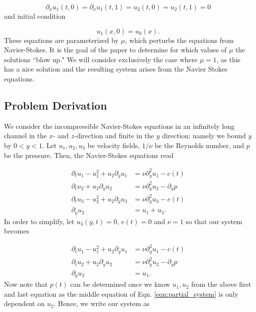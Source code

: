 \documentclass{CUP-JNL-DTM}%
\theoremstyle{definition}
\numberwithin{equation}{section}
\begin{document}
\begin{equation}
    \partial_x u_1(t,0) = \partial_x u_1(t,1) = u_2(t,0) = u_2(t,1) = 0
\end{equation}
and initial condition 

\begin{equation}
    u_1(x,0) = u_0(x).  
\end{equation}
These equations are parameterized by $\mu$, which perturbs the equations from Navier-Stokes. It is the goal of the paper to determine for which values of $\mu$ the solutions ``blow up." We will consider exclusively the case where $\mu = 1$, as this has a nice solution and the resulting system arises from the Navier Stokes equations.

\subsection{Problem Derivation}

We consider the incompressible Navier-Stokes equations in an infinitely long channel in the $x$- and $z$-direction and finite in the $y$ direction; namely we bound $y$ by $0 < y < 1$. Let $u_1, u_2, u_3$ be velocity fields, $1/\nu$ be the Reynolds number, and $p$ be the pressure. Then, the Navier-Stokes equations read

\begin{equation}
    \begin{split}
        \partial_t u_1 - u_1^2 + u_2\partial_yu_1 & = \nu \partial_y^2 u_1 - c(t) \\
        \partial_t u_2 + u_2 \partial_y u_2 & = \nu \partial_y^2 u_2 - \partial_y p \\
        \partial_t u_3 - u_3^2 + u_2\partial_y u_3 & = \nu \partial_y^2 u_3 - e(t) \\
        \partial_y u_2 & = u_1 + u_3. 
    \end{split}
\end{equation}
In order to simplify, let $u_3(y,t) = 0$, $e(t) = 0$ and $\nu = 1$ so that our system becomes 

\begin{equation}
    \begin{split}
        \partial_t u_1 - u_1^2 + u_2\partial_yu_1 & = \nu \partial_y^2 u_1 - c(t) \\
        \partial_t u_2 + u_2 \partial_y u_2 & = \nu \partial_y^2 u_2 - \partial_y p \\
        \partial_y u_2 & = u_1. 
    \end{split}
\label{eqn:partial_system}
\end{equation}
Now note that $p(t)$ can be determined once we know $u_1, u_2$ from the above first and last equation as the middle equation of Eqn. \ref{eqn:partial_system} is only dependent on $u_2$. Hence, we write our system as 
\end{document}
